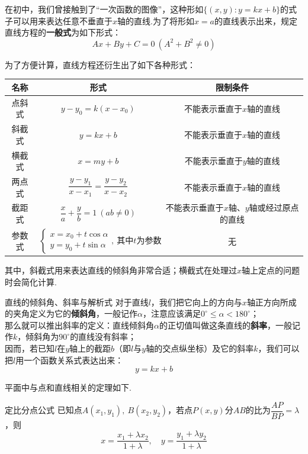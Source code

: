 \documentclass[lang=cn, zihao=5]{elegantbook}
\begin{document}
在初中，我们曾接触到了“一次函数的图像”，这种形如$\{ (x,y):y=kx+b \}$的式子可以用来表达任意不垂直于$x$轴的直线.为了将形如$x=a$的直线表示出来，规定直线方程的\textbf{一般式}为如下形式：$$Ax+By+C=0~(A^2+B^2 \neq 0)$$

为了方便计算，直线方程还衍生出了如下各种形式：

\begin{table}[h]
	\centering
	\renewcommand\arraystretch{1.5}
	\begin{tabular}{ccc}
		\toprule
		名称&形式&限制条件 \\
		\midrule
		点斜式 & $y-y_0=k(x-x_0)$ & 不能表示垂直于$x$轴的直线 \\
		斜截式 & $y=kx+b$ & 不能表示垂直于$x$轴的直线 \\
		横截式 & $x=my+b$ & 不能表示垂直于$y$轴的直线 \\
		两点式 & $\dfrac{y-y_1}{x-x_1}=\dfrac{y-y_2}{x-x_2}$ & 不能表示垂直于$x$轴的直线 \\
		截距式 & $\dfrac{x}{a}+\dfrac{y}{b}=1~(ab \neq 0)$ & 不能表示垂直于$x$轴、$y$轴或经过原点的直线 \\
		参数式 & $\begin{cases}
			x=x_0+t\cos \alpha \\
			y=y_0+t\sin \alpha
		\end{cases},~\textit{其中}t\textit{为参数}$ & 无 \\
		\bottomrule
	\end{tabular}
\end{table}

其中，斜截式用来表达直线的倾斜角非常合适；横截式在处理过$x$轴上定点的问题时会简化计算.

\begin{definition}{直线的倾斜角、斜率与解析式}
    对于直线$l$，我们把它向上的方向与$x$轴正方向所成的夹角定义为它的\textbf{倾斜角}，一般记作$\alpha$，注意应该满足$0^{\circ} \leq \alpha < 180^{\circ}$；\\
    那么就可以推出斜率的定义：直线倾斜角$\alpha$的正切值叫做这条直线的\textbf{斜率}，一般记作$k$，倾斜角为$90^{\circ}$的直线没有斜率；\\
    因而，若已知$l$在$y$轴上的截距$b$（即$l$与$y$轴的交点纵坐标）及它的斜率$k$，我们可以把$l$用一个函数关系式表达出来：$$y=kx+b$$
\end{definition}

平面中与点和直线相关的定理如下.

\begin{theorem}{定比分点公式}
	已知点$A(x_1,y_1),~B(x_2,y_2)$，若点$P(x,y)$分$AB$的比为$\dfrac{AP}{BP}=\lambda$，则$$x=\frac{x_1+\lambda x_2}{1+\lambda}, \quad y = \frac{y_1+\lambda y_2}{1+\lambda}$$
\end{theorem}
\end{document}
